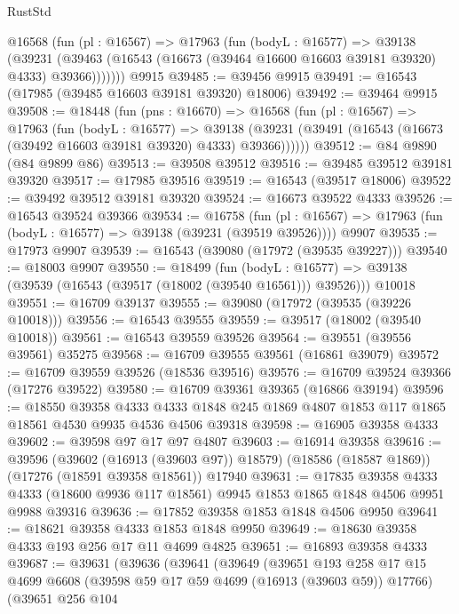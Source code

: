 \begin{lexlean}{RustStd}
\begin{coremodule}
      @16568
        (fun (pl : @16567) =>
        @17963
          (fun (bodyL : @16577) =>
          @39138
            (@39231
              (@39463 (@16543 (@16673 (@39464 @16600 @16603 @39181 @39320) @4333) @39366)))))))
    @9915
@39485 := @39456 @9915
@39491 := @16543 (@17985 (@39485 @16603 @39181 @39320) @18006)
@39492 := @39464 @9915
@39508 := @18448
    (fun (pns : @16670) =>
    @16568
      (fun (pl : @16567) =>
      @17963
        (fun (bodyL : @16577) =>
        @39138 (@39231 (@39491 (@16543 (@16673 (@39492 @16603 @39181 @39320) @4333) @39366))))))
@39512 := @84 @9890 (@84 @9899 @86)
@39513 := @39508 @39512
@39516 := @39485 @39512 @39181 @39320
@39517 := @17985 @39516
@39519 := @16543 (@39517 @18006)
@39522 := @39492 @39512 @39181 @39320
@39524 := @16673 @39522 @4333
@39526 := @16543 @39524 @39366
@39534 := @16758
    (fun (pl : @16567) => @17963 (fun (bodyL : @16577) => @39138 (@39231 (@39519 @39526))))
    @9907
@39535 := @17973 @9907
@39539 := @16543 (@39080 (@17972 (@39535 @39227)))
@39540 := @18003 @9907
@39550 := @18499
    (fun (bodyL : @16577) => @39138 (@39539 (@16543 (@39517 (@18002 (@39540 @16561))) @39526)))
    @10018
@39551 := @16709 @39137
@39555 := @39080 (@17972 (@39535 (@39226 @10018)))
@39556 := @16543 @39555
@39559 := @39517 (@18002 (@39540 @10018))
@39561 := @16543 @39559 @39526
@39564 := @39551 (@39556 @39561) @35275
@39568 := @16709 @39555 @39561 (@16861 @39079)
@39572 := @16709 @39559 @39526 (@18536 @39516)
@39576 := @16709 @39524 @39366 (@17276 @39522)
@39580 := @16709 @39361 @39365 (@16866 @39194)
@39596 := @18550
    @39358
    @4333
    @4333
    @1848
    @245
    @1869
    @4807
    @1853
    @117
    @1865
    @18561
    @4530
    @9935
    @4536
    @4506
    @39318
@39598 := @16905 @39358 @4333
@39602 := @39598 @97 @17 @97 @4807
@39603 := @16914 @39358
@39616 := @39596
    (@39602 (@16913 (@39603 @97)) @18579)
    (@18586 (@18587 @1869))
    (@17276 (@18591 @39358 @18561))
    @17940
@39631 := @17835
    @39358
    @4333
    @4333
    (@18600 @9936 @117 @18561)
    @9945
    @1853
    @1865
    @1848
    @4506
    @9951
    @9988
    @39316
@39636 := @17852 @39358 @1853 @1848 @4506 @9950
@39641 := @18621 @39358 @4333 @1853 @1848 @9950
@39649 := @18630 @39358 @4333 @193 @256 @17 @11 @4699 @4825
@39651 := @16893 @39358 @4333
@39687 := @39631
    (@39636
      (@39641
        (@39649
          (@39651
            @193
            @258
            @17
            @15
            @4699
            @6608
            (@39598 @59 @17 @59 @4699 (@16913 (@39603 @59)) @17766)
            (@39651
              @256
              @104

\end{coremodule}
\end{lexlean}
